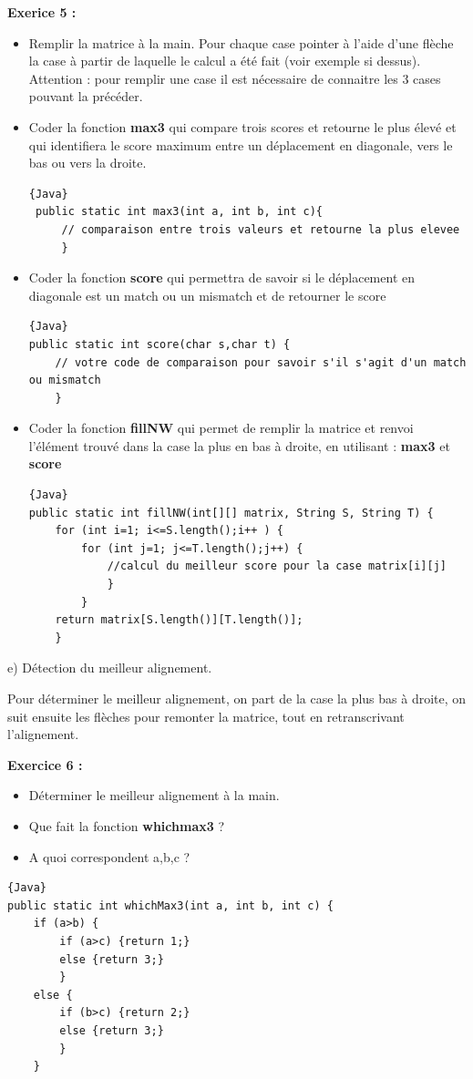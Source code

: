 \documentclass{article}
\begin{document}
    
\textbf{Exerice 5 :}
\begin{itemize}
\item Remplir la matrice à la main. Pour chaque case pointer à l’aide d’une flèche la case à partir de laquelle le calcul a été fait (voir exemple si dessus). Attention : pour remplir une case il est nécessaire de connaitre les 3 cases pouvant la précéder.
\item Coder la fonction \textbf{max3} qui compare trois scores et retourne le plus élevé et qui identifiera le score maximum entre un déplacement en diagonale, vers le bas ou vers la droite.
\begin{lstlisting}{Java}
 public static int max3(int a, int b, int c){
	 // comparaison entre trois valeurs et retourne la plus elevee
	 }
\end{lstlisting}

\item Coder la fonction \textbf{score} qui permettra de savoir si le déplacement en diagonale est un match ou un mismatch et de retourner le score
\begin{lstlisting}{Java}
public static int score(char s,char t) {
 	// votre code de comparaison pour savoir s'il s'agit d'un match ou mismatch
 	}
\end{lstlisting}

\item Coder la fonction \textbf{fillNW} qui permet de remplir la matrice et renvoi l'élément trouvé dans la case la plus en bas à droite, en utilisant : \textbf{max3} et \textbf{score} \\


\begin{lstlisting}{Java}
public static int fillNW(int[][] matrix, String S, String T) { 
	for (int i=1; i<=S.length();i++ ) {
		for (int j=1; j<=T.length();j++) {
			//calcul du meilleur score pour la case matrix[i][j]
			}
		}
	return matrix[S.length()][T.length()];
	}
\end{lstlisting}
\end{itemize}
\newpage

e) Détection du meilleur alignement.

Pour déterminer le meilleur alignement, on part de la case la plus bas à droite, on suit ensuite les flèches pour remonter la matrice, tout en retranscrivant l’alignement. 

\medbreak
\textbf{Exercice 6 :}
\begin{itemize}
\item Déterminer le meilleur alignement à la main.
\item Que fait la fonction \textbf{whichmax3} ?
\item A quoi correspondent a,b,c ?
\end{itemize}
\medbreak
\begin{lstlisting}{Java}
public static int whichMax3(int a, int b, int c) {
	if (a>b) {
		if (a>c) {return 1;}
		else {return 3;}
		}
	else {
		if (b>c) {return 2;}
		else {return 3;}
		}
	}
\end{lstlisting}
\end{document}
